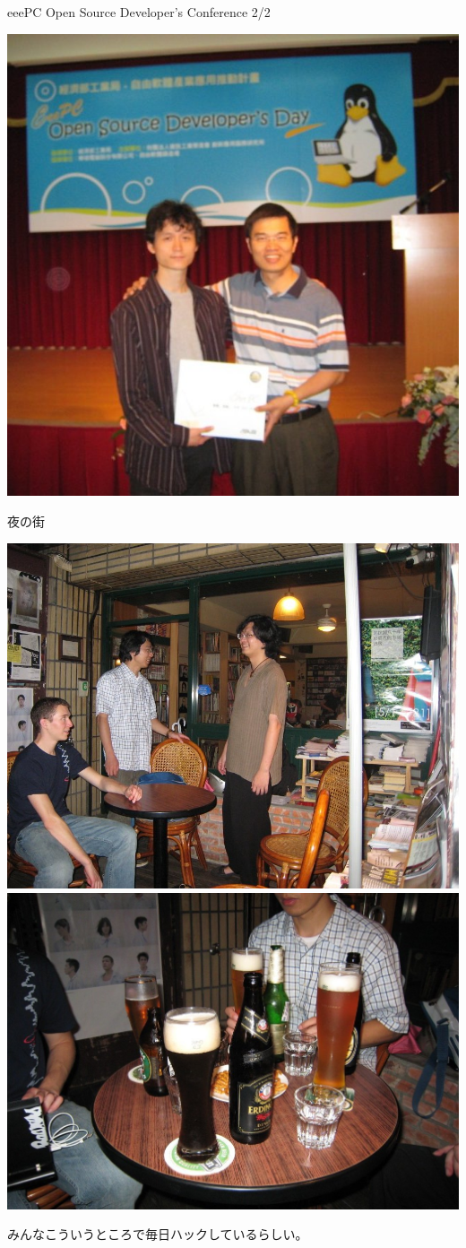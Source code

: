 \documentclass[cjk,dvipdfmx,12pt]{beamer}
\begin{document}
\begin{frame}{eeePC Open Source Developer's Conference 2/2}

\includegraphics[width=1\hsize]{image200805/eeepc-give.jpg}

\end{frame}

\begin{frame}{夜の街}

\includegraphics[width=0.45\hsize]{image200805/nightpub1.jpg}
\includegraphics[width=0.45\hsize]{image200805/nightpub2.jpg}

みんなこういうところで毎日ハックしているらしい。

\end{frame}
\end{document}
